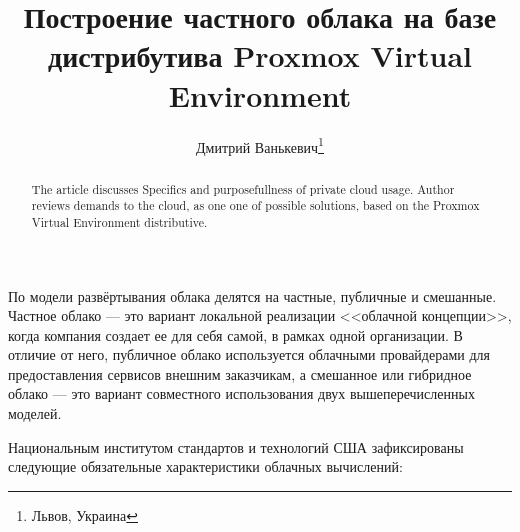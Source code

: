 \documentclass[10pt, a5paper]{article}
\begin{document}
\title{Построение частного облака на базе дистрибутива Proxmox Virtual Environment}%

\author{Дмитрий Ванькевич\footnote{Львов, Украина}}
\maketitle

\begin{abstract}
The article discusses Specifics and purposefullness of private cloud usage. Author reviews demands to the cloud, as one one of possible solutions, based on the Proxmox Virtual  Environment distributive.
\end{abstract}


По модели развёртывания облака делятся на частные, публичные и смешанные.
Частное облако --- это вариант локальной реализации <<облачной концепции>>, когда компания создает ее для себя самой, в рамках одной организации. В отличие от него, публичное облако используется облачными провайдерами для предоставления сервисов внешним заказчикам, а смешанное или гибридное облако --- это вариант совместного использования двух вышеперечисленных моделей.

Национальным институтом стандартов и технологий США зафиксированы следующие обязательные характеристики облачных вычислений:
\end{document}
